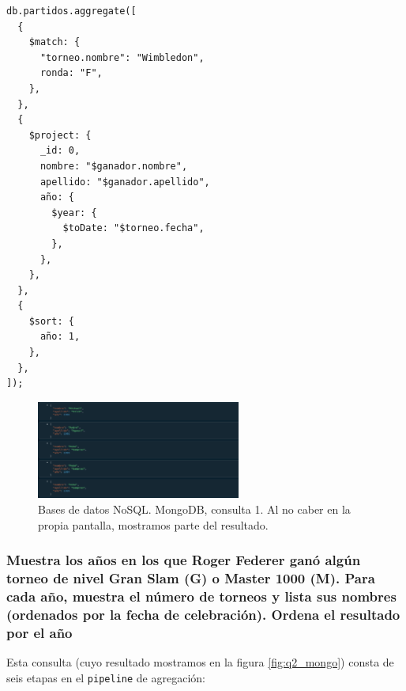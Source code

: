\begin{verbatim}
db.partidos.aggregate([
  {
    $match: {
      "torneo.nombre": "Wimbledon",
      ronda: "F",
    },
  },
  {
    $project: {
      _id: 0,
      nombre: "$ganador.nombre",
      apellido: "$ganador.apellido",
      año: {
        $year: {
          $toDate: "$torneo.fecha",
        },
      },
    },
  },
  {
    $sort: {
      año: 1,
    },
  },
]);
\end{verbatim}

\begin{figure}[H]
\centering
\includegraphics[width=0.6\textwidth]{fotos/mongo/q1.png}
\caption{Bases de datos NoSQL. MongoDB, consulta 1. Al no caber en la propia pantalla, mostramos parte del resultado.}
\label{fig:q1_mongo}
\end{figure}


\subsubsection{Muestra los años en los que Roger Federer ganó algún torneo de nivel Gran Slam (G) o Master 1000 (M). Para cada año, muestra el número de torneos y lista sus nombres (ordenados por la fecha de celebración). Ordena el resultado por el año}

Esta consulta (cuyo resultado mostramos en la figura \ref{fig:q2_mongo}) consta de seis etapas en el \texttt{pipeline} de agregación:

